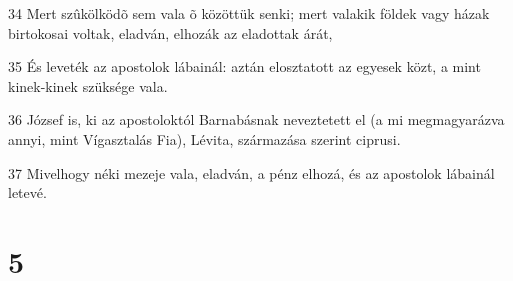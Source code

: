 \par 34 Mert szûkölködõ sem vala õ közöttük senki; mert valakik földek vagy házak birtokosai voltak, eladván, elhozák az eladottak árát,
\par 35 És leveték az apostolok lábainál: aztán elosztatott az egyesek közt, a mint kinek-kinek szüksége vala.
\par 36 József is, ki az apostoloktól Barnabásnak neveztetett el (a mi megmagyarázva annyi, mint Vígasztalás Fia), Lévita, származása szerint ciprusi.
\par 37 Mivelhogy néki mezeje vala, eladván, a pénz elhozá, és az apostolok lábainál letevé.

\chapter{5}

